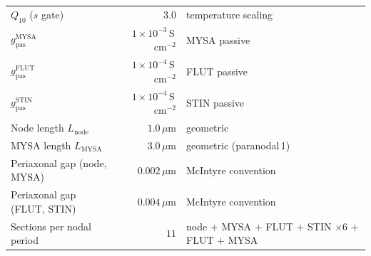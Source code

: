 \begin{table}[h]
\begin{tabular}{l r p{4.7cm}}
    $Q_{10}$ ($s$ gate)       & $3.0$        & temperature scaling \\
    $g_{\mathrm{pas}}^{\mathrm{MYSA}}$ & $1\times 10^{-3}$\,S\,cm$^{-2}$ & MYSA passive \\
    $g_{\mathrm{pas}}^{\mathrm{FLUT}}$ & $1\times 10^{-4}$\,S\,cm$^{-2}$ & FLUT passive \\
    $g_{\mathrm{pas}}^{\mathrm{STIN}}$ & $1\times 10^{-4}$\,S\,cm$^{-2}$ & STIN passive \\
    Node length $L_{\mathrm{node}}$    & $1.0\,\mu$m & geometric \\
    MYSA length $L_{\mathrm{MYSA}}$    & $3.0\,\mu$m & geometric (paranodal\,1) \\
    Periaxonal gap (node, MYSA)        & $0.002\,\mu$m & McIntyre convention \\
    Periaxonal gap (FLUT, STIN)        & $0.004\,\mu$m & McIntyre convention \\
    Sections per nodal period          & $11$         & node $+$ MYSA $+$ FLUT $+$ STIN $\times 6$ $+$ FLUT $+$ MYSA \\
    \bottomrule
  \end{tabular}
\end{table}

